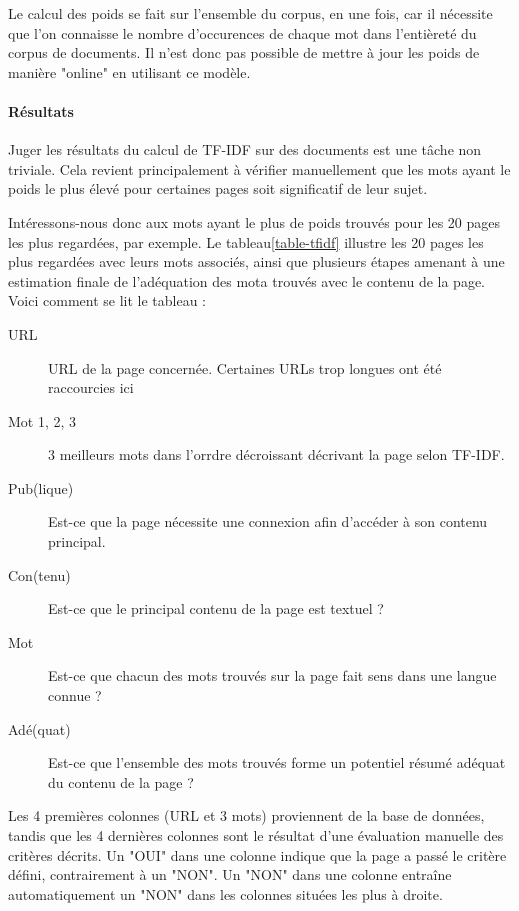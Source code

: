 				Le calcul des poids se fait sur l'ensemble du corpus, en une fois, car il nécessite que l'on connaisse le nombre d'occurences de chaque mot dans l'entièreté du corpus de documents. Il n'est donc pas possible de mettre à jour les poids de manière "online" en utilisant ce modèle.

			\paragraph{Résultats}

				Juger les résultats du calcul de TF-IDF sur des documents est une tâche non triviale. Cela revient principalement à vérifier manuellement que les mots ayant le poids le plus élevé pour certaines pages soit significatif de leur sujet.

				Intéressons-nous donc aux mots ayant le plus de poids trouvés pour les 20 pages les plus regardées, par exemple. Le tableau\ref{table-tfidf} illustre les 20 pages les plus regardées avec leurs mots associés, ainsi que plusieurs étapes amenant à une estimation finale de l'adéquation des mota trouvés avec le contenu de la page. Voici comment se lit le tableau :
				\begin{description}
					\item[URL] URL de la page concernée. Certaines URLs trop longues ont été raccourcies ici
					\item[Mot 1, 2, 3] 3 meilleurs mots dans l'orrdre décroissant décrivant la page selon TF-IDF.
					\item[Pub(lique)] Est-ce que la page nécessite une connexion afin d'accéder à son contenu principal.
					\item[Con(tenu)] Est-ce que le principal contenu de la page est textuel ?
					\item[Mot] Est-ce que chacun des mots trouvés sur la page fait sens dans une langue connue ?
					\item[Adé(quat)] Est-ce que l'ensemble des mots trouvés forme un potentiel résumé adéquat du contenu de la page ?
				\end{description}

				Les 4 premières colonnes (URL et 3 mots) proviennent de la base de données, tandis que les 4 dernières colonnes sont le résultat d'une évaluation manuelle des critères décrits. Un "OUI" dans une colonne indique que la page a passé le critère défini, contrairement à un "NON". Un "NON" dans une colonne entraîne automatiquement un "NON" dans les colonnes situées les plus à droite.

